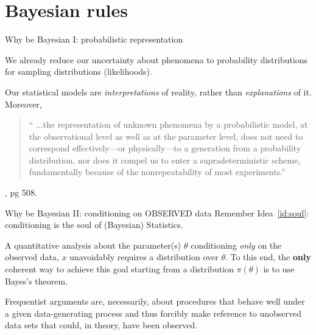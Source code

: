 \section{Bayesian rules}
\begin{frame}{Why be Bayesian I: probabilistic representation}

We already reduce our uncertainty about phenomena to probability distributions for sampling distributions (likelihoods).

\begin{idea}
 \label{id:prob_uncertainty}
 Our statistical models are \textit{interpretations} of reality, rather than \textit{explanations} of it.
 Moreover,
 \begin{quote}
 `` ...the representation of unknown phenomena by a probabilistic model,  at the observational level as well as at the parameter level, does not need to correspond effectively—or physically—to a generation from a probability distribution, nor does it compel us to enter a supradeterministic scheme, fundamentally because of the nonrepeatability of most experiments.''
 \end{quote}
 \cite{Robert2007}, pg 508.
\end{idea}
 \end{frame}
\begin{frame}{Why be Bayesian II: conditioning on OBSERVED data}
  Remember Idea~\ref{id:soul}: conditioning is the soul of (Bayesian) Statistics.
  \begin{idea}
   \label{id:obs_data}
   A quantitative analysis about the parameter(s) $\theta$ conditioning \textit{only} on the observed data, $x$ unavoidably requires a distribution over $\theta$.
   To this end, the \textbf{only} coherent way to achieve this goal starting from a distribution $\pi(\theta)$ is to use Bayes's theorem.
  \end{idea}
  
  Frequentist arguments are, necessarily, about procedures that behave well under a given data-generating process and thus forcibly make reference to unobserved data sets that could, in theory, have been observed.
 \end{frame}
